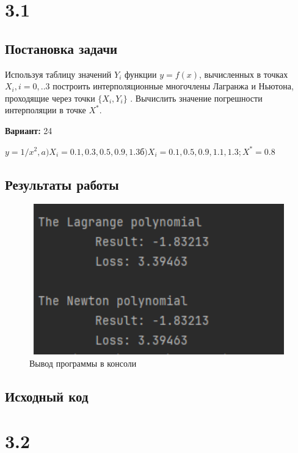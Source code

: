 \section* {3.1}

\subsection{Постановка задачи}
Используя таблицу значений $Y_i$  функции $y=f(x)$, вычисленных в точках   $X_i, i=0,..3$  построить интерполяционные многочлены Лагранжа и Ньютона, проходящие через точки $\{X_i,Y_i \}$ .  Вычислить значение погрешности интерполяции в точке $X^*$. 

{\bfseries Вариант:} 24

$y=1/x^2, a)X_i= 0.1,0.3,0.5,0.9,1.3  
б) X_i= 0.1,0.5,0.9,1.1,1.3; X^* = 0.8$

\subsection{Результаты работы}
\begin{figure}[h!]
\centering
\includegraphics[width=12cm, height=6.5cm]{img/lab3_1_res.png}
\caption{Вывод программы в консоли}
\end{figure}
\pagebreak


\subsection{Исходный код}








\pagebreak

\section* {3.2}

